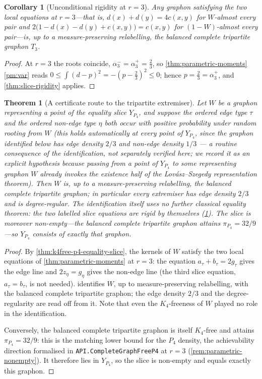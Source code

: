 \documentclass[11pt]{article}
\newtheorem{theorem}{Theorem}
\newtheorem{corollary}[corollary]{Corollary}
\theoremstyle{definition}
\begin{document}
\begin{corollary}[Unconditional rigidity at $r=3$]\label{cor:r3-rigidity}
Any graphon satisfying the two local equations at $r=3$---that is,
$d(x)+d(y)=4c(x,y)$ for $W$-almost every pair and
$2\bigl(1-d(x)-d(y)+c(x,y)\bigr)=c(x,y)$ for $(1-W)$-almost every pair---is, up to a
measure-preserving relabelling, the balanced complete tripartite graphon $T_3$.
\end{corollary}

\begin{proof}
At $r=3$ the roots coincide, $\alpha_3^-=\alpha_3^+=\frac23$, so
\cref{thm:parametric-moments}\ref{pm:var} reads
$0\le\int(d-p)^2=-(p-\frac23)^2\le0$; hence $p=\frac23=\alpha_3^+$, and
\cref{thm:slice-rigidity} applies.
\end{proof}

\begin{theorem}[A certificate route to the tripartite extremiser]\label{thm:k4free-p4-tripartite}
Let $W$ be a graphon representing a point of the equality slice $Y_{P_4}$, and suppose the
ordered edge type $\tau$ and the ordered non-edge type $\eta$ both occur with positive
probability under random rooting from $W$ (this holds automatically at every point of
$Y_{P_4}$, since the graphon identified below has edge density $2/3$ and non-edge density
$1/3$ --- a routine consequence of the identification, not separately verified here; we
record it as an explicit hypothesis because passing from a point of $Y_{P_4}$ to some
representing graphon $W$ already invokes the existence half of the Lov\'asz--Szegedy
representation theorem).  Then $W$ is, up to a measure-preserving relabelling, the
balanced complete tripartite graphon; in particular every extremiser has edge density
$2/3$ and is degree-regular.  The identification itself uses no further classical equality
theorem: the two labelled slice equations are rigid by themselves
(\cref{cor:r3-rigidity}).  The slice is moreover non-empty---the balanced complete
tripartite graphon attains $\pi_{P_4}=32/9$---so $Y_{P_4}$ consists of exactly that
graphon.
\end{theorem}

\begin{proof}
By \cref{thm:k4free-p4-equality-slice}, the
kernels of $W$ satisfy the two local equations of \cref{thm:parametric-moments} at
$r=3$: the equation $a_\tau+b_\tau=2g_\tau$ gives the edge line and $2z_\eta=g_\eta$
gives the non-edge line (the third slice equation, $a_\tau=b_\tau$, is not needed).
 identifies $W$, up to measure-preserving relabelling, with the
balanced complete tripartite graphon; the edge density $2/3$ and the degree-regularity
are read off from it.  Note that even the $K_4$-freeness of $W$ played no role in the
identification.

Conversely, the balanced complete tripartite graphon is itself $K_4$-free and attains
$\pi_{P_4}=32/9$: this is the matching lower bound for the $P_4$ density, the achievability
direction formalised in \texttt{API.CompleteGraphFreeP4} at $r=3$
(\cref{rem:parametric-nonempty}).  It therefore lies in
$Y_{P_4}$, so the slice is non-empty and equals exactly this graphon.
\end{proof}
\end{document}
